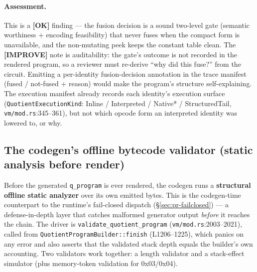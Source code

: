 \paragraph{Assessment.} This is a
\textcolor{tracegreen}{\textbf{[OK]}} finding --- the fusion
decision is a sound two-level gate (semantic worthiness +
encoding feasibility) that never fuses when the compact form is
unavailable, and the non-mutating peek keeps the constant table
clean. The \textcolor{codegenblue}{\textbf{[IMPROVE]}} note is
auditability: the gate's outcome is not recorded in the rendered
program, so a reviewer must re-derive ``why did this fuse?'' from
the circuit. Emitting a per-identity fusion-decision annotation in
the trace manifest (fused / not-fused + reason) would make the
program's structure self-explaining.  The
execution manifest already records each identity's execution
surface (\texttt{QuotientExecutionKind}: Inline / Interpreted /
Native* / StructuredTail, \texttt{vm/mod.rs}:345--361), but not
which opcode form an interpreted identity was lowered to, or why.

\subsection{The codegen's offline bytecode validator (static analysis before render)}
\label{sec:pr-offline-validator}

Before the generated \texttt{q\_program} is ever rendered, the
codegen runs a \textbf{structural offline static analyzer} over its
own emitted bytes. This is the codegen-time counterpart to the
runtime's fail-closed dispatch (§\ref{sec:pr-failclosed}) --- a
defense-in-depth layer that catches malformed generator output
\emph{before} it reaches the chain. The driver is
\texttt{validate\_\allowbreak{}quotient\_\allowbreak{}program} (\texttt{vm/mod.rs}:2003--2021),
called from \texttt{QuotientProgramBuilder::finish}
(L1206--1225), which panics on any error and also asserts that the
validated stack depth equals the builder's own accounting. Two
validators work together: a length validator and a stack-effect
simulator (plus memory-token validation for 0x03/0x04).

